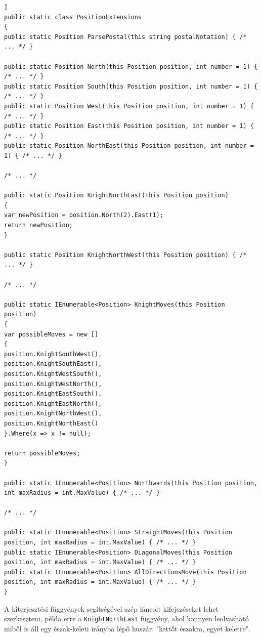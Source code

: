 \documentclass[twoside, a4paper, 12pt]{article}
\begin{document}
\begin{lstlisting}[caption=Pozíciók segédfüggvényes - PositionExtensions osztály, label=lst:chessboardpositionextensions_code, float,floatplacement=H]]
public static class PositionExtensions
{
public static Position ParsePostal(this string postalNotation) { /* ... */ }

public static Position North(this Position position, int number = 1) { /* ... */ }
public static Position South(this Position position, int number = 1) { /* ... */ }
public static Position West(this Position position, int number = 1) { /* ... */ }
public static Position East(this Position position, int number = 1) { /* ... */ }
public static Position NorthEast(this Position position, int number = 1) { /* ... */ }

/* ... */

public static Position KnightNorthEast(this Position position)
{
var newPosition = position.North(2).East(1);
return newPosition;
}

public static Position KnightNorthWest(this Position position) { /* ... */ }

/* ... */

public static IEnumerable<Position> KnightMoves(this Position position)
{
var possibleMoves = new []
{
position.KnightSouthWest(),
position.KnightSouthEast(),
position.KnightWestSouth(),
position.KnightWestNorth(),
position.KnightEastSouth(),
position.KnightEastNorth(),
position.KnightNorthWest(),
position.KnightNorthEast()
}.Where(x => x != null);

return possibleMoves;
}

public static IEnumerable<Position> Northwards(this Position position, int maxRadius = int.MaxValue) { /* ... */ }

/* ... */

public static IEnumerable<Position> StraightMoves(this Position position, int maxRadius = int.MaxValue) { /* ... */ }
public static IEnumerable<Position> DiagonalMoves(this Position position, int maxRadius = int.MaxValue) { /* ... */ }
public static IEnumerable<Position> AllDirectionsMove(this Position position, int maxRadius = int.MaxValue) { /* ... */ }
}

\end{lstlisting}

A kiterjesztési függvények segítségével szép láncolt kifejezéseket lehet szerkeszteni, példa erre a \texttt{KnightNorthEast} függvény, ahol könnyen leolvasható miből is áll egy észak-keleti irányba lépő huszár: "kettőt északra, egyet keletre".
\end{document}
